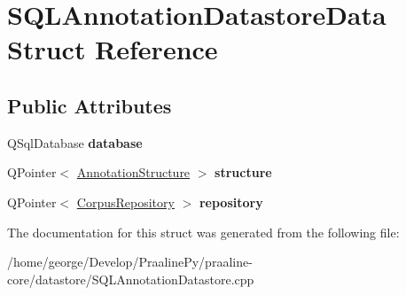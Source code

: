 \hypertarget{struct_s_q_l_annotation_datastore_data}{}\section{S\+Q\+L\+Annotation\+Datastore\+Data Struct Reference}
\label{struct_s_q_l_annotation_datastore_data}
\subsection*{Public Attributes}
\begin{DoxyCompactItemize}
\item 
\mbox{\label{struct_s_q_l_annotation_datastore_data_addc2dcce562a98c0b43066e5769c8a9a}} 
Q\+Sql\+Database {\bfseries database}
\item 
\mbox{\label{struct_s_q_l_annotation_datastore_data_a102452f174a91dd31a626d0d01200901}} 
Q\+Pointer$<$ \hyperlink{class_annotation_structure}{Annotation\+Structure} $>$ {\bfseries structure}
\item 
\mbox{\label{struct_s_q_l_annotation_datastore_data_a455a11abe60b1bfb5e485a4ffda2a152}} 
Q\+Pointer$<$ \hyperlink{class_corpus_repository}{Corpus\+Repository} $>$ {\bfseries repository}
\end{DoxyCompactItemize}


The documentation for this struct was generated from the following file\+:\begin{DoxyCompactItemize}
\item 
/home/george/\+Develop/\+Praaline\+Py/praaline-\/core/datastore/S\+Q\+L\+Annotation\+Datastore.\+cpp\end{DoxyCompactItemize}
